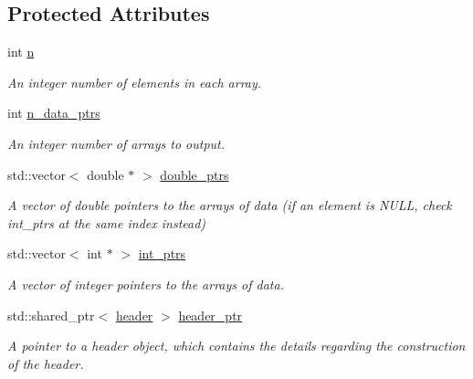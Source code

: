 \subsection*{Protected Attributes}
\begin{DoxyCompactItemize}
\item 
\hypertarget{classio_1_1output_acc0b537649132b91846a89931933554d}{int \hyperlink{classio_1_1output_acc0b537649132b91846a89931933554d}{n}}\label{classio_1_1output_acc0b537649132b91846a89931933554d}

\begin{DoxyCompactList}\small\item\em An integer number of elements in each array. \end{DoxyCompactList}\item 
\hypertarget{classio_1_1output_a3cd5f0fc09271a653568abc8e10de6aa}{int \hyperlink{classio_1_1output_a3cd5f0fc09271a653568abc8e10de6aa}{n\-\_\-data\-\_\-ptrs}}\label{classio_1_1output_a3cd5f0fc09271a653568abc8e10de6aa}

\begin{DoxyCompactList}\small\item\em An integer number of arrays to output. \end{DoxyCompactList}\item 
\hypertarget{classio_1_1output_a88f0aef3b2bc117e94a876435e59ff96}{std\-::vector$<$ double $\ast$ $>$ \hyperlink{classio_1_1output_a88f0aef3b2bc117e94a876435e59ff96}{double\-\_\-ptrs}}\label{classio_1_1output_a88f0aef3b2bc117e94a876435e59ff96}

\begin{DoxyCompactList}\small\item\em A vector of double pointers to the arrays of data (if an element is N\-U\-L\-L, check int\-\_\-ptrs at the same index instead) \end{DoxyCompactList}\item 
\hypertarget{classio_1_1output_adb08e827090160f0457cb5260bb2998a}{std\-::vector$<$ int $\ast$ $>$ \hyperlink{classio_1_1output_adb08e827090160f0457cb5260bb2998a}{int\-\_\-ptrs}}\label{classio_1_1output_adb08e827090160f0457cb5260bb2998a}

\begin{DoxyCompactList}\small\item\em A vector of integer pointers to the arrays of data. \end{DoxyCompactList}\item 
\hypertarget{classio_1_1output_a9b505ce2bcef3ef4d1bd770b2a718aa0}{std\-::shared\-\_\-ptr$<$ \hyperlink{classio_1_1header}{header} $>$ \hyperlink{classio_1_1output_a9b505ce2bcef3ef4d1bd770b2a718aa0}{header\-\_\-ptr}}\label{classio_1_1output_a9b505ce2bcef3ef4d1bd770b2a718aa0}

\begin{DoxyCompactList}\small\item\em A pointer to a header object, which contains the details regarding the construction of the header. \end{DoxyCompactList}\end{DoxyCompactItemize}


